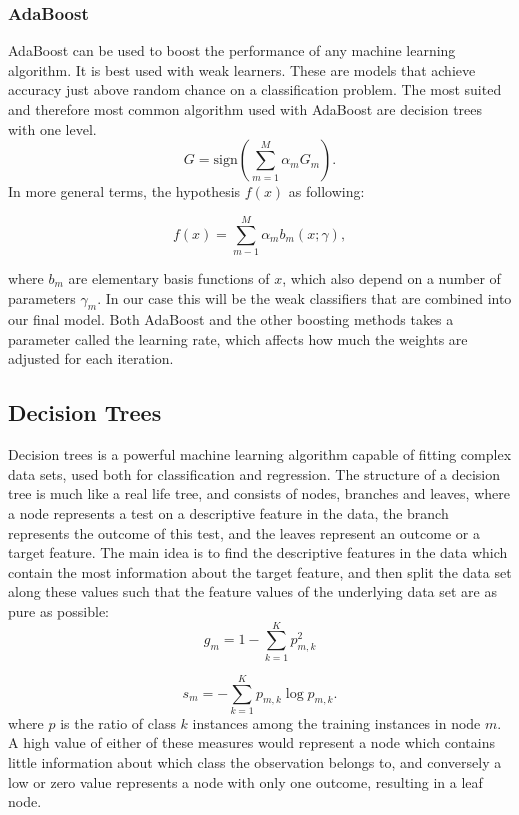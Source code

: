 \begin{Methods}
\subsubsection{AdaBoost}

AdaBoost can be used to boost the performance of any machine learning algorithm. It is best used with weak learners. These are models that achieve accuracy just above random chance on a classification problem. The most suited and therefore most common algorithm used with AdaBoost are decision trees with one level.
\begin{equation}
    G = \text{sign} \left( \sum_{m=1}^M \alpha_m G_m \right).
    \label{eq:boosting}
\end{equation}
 In more general terms, the hypothesis $f(x)$ as following:


\begin{equation}
    f(x) = \sum_{m-1}^M \alpha_m b_m (x; \gamma),
\end{equation}

where $b_m$ are elementary basis functions of $x$, which also depend on a number of parameters $\gamma_m$. In our case this will be the weak classifiers that are combined into our final model. Both AdaBoost and the other boosting methods takes a parameter called the learning rate, which affects how much the weights are adjusted for each iteration.

\subsection{Decision Trees}
Decision trees is a powerful machine learning algorithm capable of fitting complex data sets, used both for classification and regression. The structure of a decision tree is much like a real life tree, and consists of nodes, branches and leaves, where a node represents a test on a descriptive feature in the data, the branch represents the outcome of this test, and the leaves represent an outcome or a target feature. The main idea is to find the descriptive features in the data which contain the most information about the target feature, and then split the data set along these values such that the feature values of the underlying data set are as pure as possible:
\begin{equation}
\label{eq:gini_index}
    g_m = 1 - \sum_{k=1}^K p_{m, k}^2
\end{equation}

\begin{equation}
\label{eq:info_entropy}
    s_m = - \sum_{k=1}^K p_{m, k}\log{p_{m,k}}.
\end{equation}
where $p$ is the ratio of class $k$ instances among the training instances in node $m$. A high value of either of these measures would represent a node which contains little information about which class the observation belongs to, and conversely a low or zero value represents a node with only one outcome, resulting in a leaf node.



\end{Methods}
